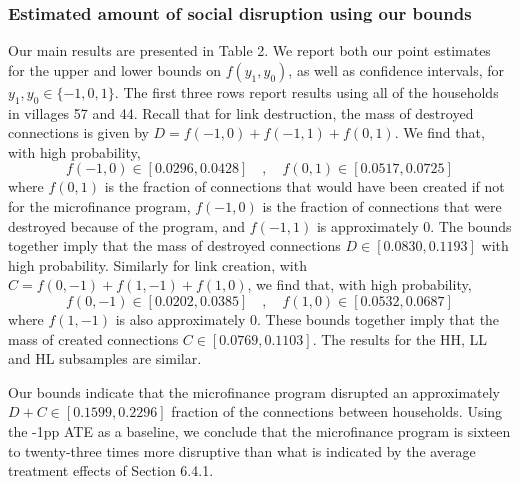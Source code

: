 \documentclass[12pt]{article}
\theoremstyle{definition}
\begin{document}
\subsubsection{Estimated amount of social disruption using our bounds}
Our main results are presented in Table 2. We report both our point estimates for the upper and lower bounds on $f(y_1,y_0)$, as well as confidence intervals, for $y_1,y_0 \in \{-1,0,1\}$. The first three rows report results using all of the households in villages 57 and 44. Recall that for link destruction, the mass of destroyed connections is given by $D = f(-1,0) + f(-1,1) + f(0,1)$. We find that, with high probability,  $$f(-1,0) \in [0.0296, 0.0428] \quad , \quad f(0,1) \in [0.0517, 0.0725] $$
where $f(0,1)$ is the fraction of connections that would have been created if not for the microfinance program, $f(-1,0)$ is the fraction of connections that were destroyed because of the program, and $f(-1,1)$ is approximately $0$. The bounds together imply that the mass of destroyed connections $D \in [0.0830,0.1193]$ with high probability. Similarly for link creation, with $C = f(0,-1)+f(1,-1)+f(1,0)$, we find that, with high probability,
$$f(0,-1) \in [0.0202, 0.0385] \quad ,\quad f(1,0) \in [0.0532, 0.0687]$$ where $f(1,-1)$ is also approximately $0$. These bounds together imply that the mass of created connections $C \in [0.0769,0.1103]$. The results for the HH, LL and HL subsamples are similar. 

Our bounds indicate that the microfinance program disrupted an approximately $D+C \in [0.1599, 0.2296]$ fraction of the connections between households. Using the -1pp ATE as a baseline, we conclude that the microfinance program is sixteen to twenty-three times more disruptive than what is indicated by the average treatment effects of Section 6.4.1. 
\end{document}
